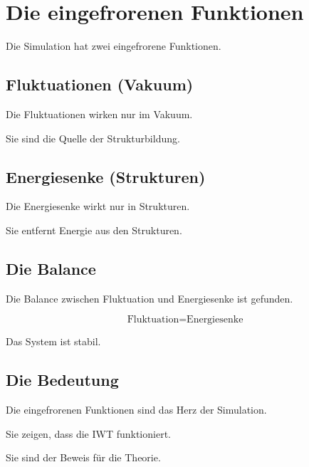 
\section{Die eingefrorenen Funktionen}

Die Simulation hat zwei eingefrorene Funktionen.

\subsection{Fluktuationen (Vakuum)}

Die Fluktuationen wirken nur im Vakuum.

Sie sind die Quelle der Strukturbildung.

\subsection{Energiesenke (Strukturen)}

Die Energiesenke wirkt nur in Strukturen.

Sie entfernt Energie aus den Strukturen.

\subsection{Die Balance}

Die Balance zwischen Fluktuation und Energiesenke ist gefunden.

\[
\text{Fluktuation} = \text{Energiesenke}
\]

Das System ist stabil.

\subsection{Die Bedeutung}

Die eingefrorenen Funktionen sind das Herz der Simulation.

Sie zeigen, dass die IWT funktioniert.

Sie sind der Beweis für die Theorie.